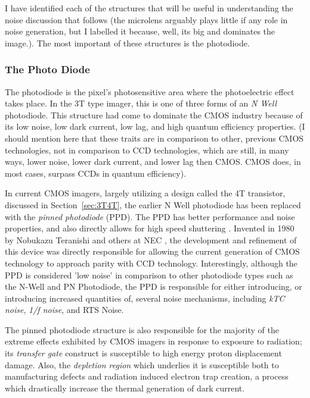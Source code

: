 \documentclass[10pt]{article}
\begin{document}
I have identified each of the structures that will be useful in understanding the noise discussion that follows (the microlens arguably plays little if any role in noise generation, but I labelled it because, well, its big and dominates the image.). The most important of these structures is the photodiode.

\subsubsection{The Photo Diode}

The photodiode is the pixel's photosensitive area where the photoelectric effect takes place. In the 3T type imager, this is one of three forms of an \emph{N Well} photodiode. This structure had come to dominate the CMOS industry because of its low noise, low dark current, low lag, and high quantum efficiency properties. (I should mention here that these traits are in comparison to other, previous CMOS technologies, not in comparison to CCD technologies, which are still, in many ways, lower noise, lower dark current, and lower lag then CMOS. CMOS does, in most cases, surpass CCDs in quantum efficiency). 

In current CMOS imagers, largely utilizing a design called the 4T transistor, discussed in Section~\ref{sec:3T4T}, the earlier N Well photodiode has been replaced with the \emph{pinned photodiode} (PPD). The PPD has better performance and noise properties, and also directly allows for high speed shuttering \cite{teranishi15}. Invented in 1980 by Nobukazu Teranishi and others at NEC \cite{website:WikiAPS}, the development and refinement of this device was directly responsible for allowing the current generation of CMOS technology to approach parity with CCD technology. Interestingly, although the PPD is considered 'low noise' in comparison to other photodiode types such as the N-Well and PN Photodiode, the PPD is responsible for either introducing, or introducing increased quantities of,  several noise mechanisms, including \emph{kTC noise}, \emph{1/f noise}, and RTS Noise. 


The pinned photodiode structure is also responsible for the majority of the extreme effects exhibited by CMOS imagers in response to exposure to radiation; its \emph{transfer gate} construct is susceptible to high energy proton displacement damage. Also, the \emph{depletion region} which underlies it is susceptible both to manufacturing defects and radiation induced electron trap creation, a process which drastically increase the thermal generation of dark current.
\end{document}
